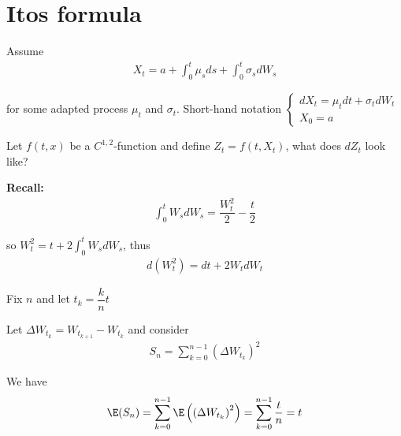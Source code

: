 \section{Itos formula}
\noindent Assume 
\begin{equation*}
  \begin{gathered}
    X_t = a+\int_{0}^{t}\mu_sds + \int_{0}^{t}\sigma_sdW_s
  \end{gathered}
\end{equation*}\par
\noindent for some adapted process $\mu_t$ and $\sigma_t$. Short-hand notation $\begin{cases}dX_t = \mu_tdt+\sigma_tdW_t\\X_0=a\end{cases}$
\par\bigskip
\noindent Let $f(t,x)$ be a $C^{1,2}$-function and define $Z_t = f(t,X_t)$, what does $dZ_t$ look like?
\par\bigskip
\noindent\textbf{Recall:}
\begin{equation*}
  \begin{gathered}
    \int_{0}^{t}W_sdW_s = \dfrac{W_t^2}{2}-\dfrac{t}{2}
  \end{gathered}
\end{equation*}\par
\noindent so $W_t^2 = t+2\int_{0}^{t}W_sdW_s$, thus 
\begin{equation*}
  \begin{gathered}
    d(W_t^2) = dt +2W_tdW_t
  \end{gathered}
\end{equation*}\par
\noindent Fix $n$ and let $t_k = \dfrac{k}{n}t$\par
\noindent Let $\Delta W_{t_k} = W_{t_{k+1}}-W_{t_k}$ and consider
\begin{equation*}
  \begin{gathered}
    S_n = \sum_{k=0}^{n-1} \left(\Delta W_{t_k}\right)^2
  \end{gathered}
\end{equation*}\par
\noindent We have 
\begin{equation*}
  \begin{gathered}
    \E(S_n) = \sum_{k=0}^{n-1}\E\left(\left(\Delta W_{t_k}\right)^2\right) = \sum_{k=0}^{n-1}\dfrac{t}{n} = t
  \end{gathered}
\end{equation*}\par
